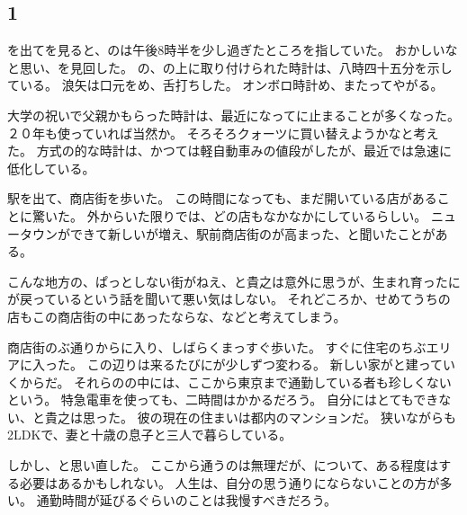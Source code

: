 \documentclass[chapter3.tex]{subfiles}
\begin{document}
\begin{CJK}{UTF8}{ipxm}
    \section*{1}

    を出てを見ると、のは午後8時半を少し過ぎたところを指していた。
    おかしいなと思い、を見回した。
    の、の上に取り付けられた時計は、八時四十五分を示している。
    浪矢は口元をめ、舌打ちした。
    オンボロ時計め、またってやがる。

    大学の祝いで父親かもらった時計は、最近になってに止まることが多くなった。
    ２０年も使っていれば当然か。
    そろそろクォーツに買い替えようかなと考えた。
    方式の的な時計は、かつては軽自動車みの値段がしたが、最近では急速に低化している。

    駅を出て、商店街を歩いた。
    この時間になっても、まだ開いている店があることに驚いた。
    外からいた限りでは、どの店もなかなかにしているらしい。
    ニュータウンができて新しいが増え、駅前商店街のが高まった、と聞いたことがある。

    こんな地方の、ぱっとしない街がねえ、と貴之は意外に思うが、生まれ育ったにが戻っているという話を聞いて悪い気はしない。
    それどころか、せめてうちの店もこの商店街の中にあったならな、などと考えてしまう。

    商店街のぶ通りからに入り、しばらくまっすぐ歩いた。
    すぐに住宅のちぶエリアに入った。
    この辺りは来るたびにが少しずつ変わる。
    新しい家がと建っていくからだ。
    それらのの中には、ここから東京まで通勤している者も珍しくないという。
    特急電車を使っても、二時間はかかるだろう。
    自分にはとてもできない、と貴之は思った。
    彼の現在の住まいは都内のマンションだ。
    狭いながらも2LDKで、妻と十歳の息子と三人で暮らしている。

    しかし、と思い直した。
    ここから通うのは無理だが、について、ある程度はする必要はあるかもしれない。
    人生は、自分の思う通りにならないことの方が多い。
    通勤時間が延びるぐらいのことは我慢すべきだろう。


\end{CJK}
\end{document}
